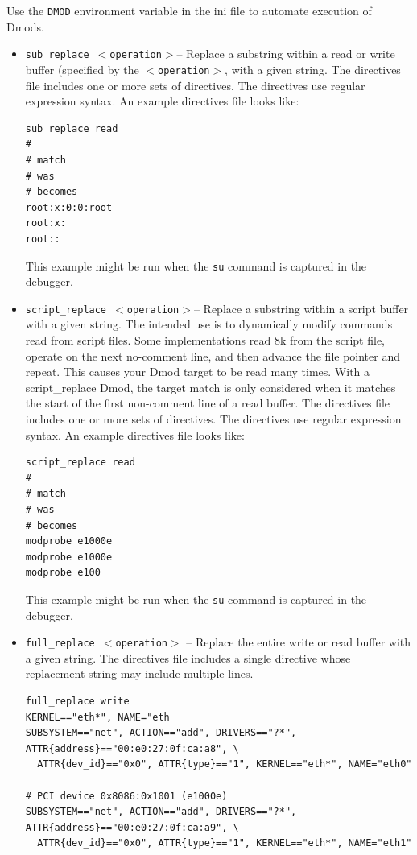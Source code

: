 \documentclass[titlepage]{article}
\begin{document}
Use the {\tt DMOD} environment variable in the ini file to automate execution of Dmods.
 
\begin{itemize}
\item {\tt sub\_replace $<$operation$>$}-- Replace a substring within a read or write buffer (specified by the
{\tt $<$operation$>$}, with a given string.
The directives file includes one or more sets of directives.
The directives use regular expression syntax.
An example directives file looks like:
\begin{verbatim}
sub_replace read
#
# match
# was
# becomes
root:x:0:0:root
root:x:
root::
\end{verbatim}
\noindent This example might be run when the {\tt su} command is captured in the debugger.

\item {\tt script\_replace $<$operation$>$}-- Replace a substring within a script buffer with a given string.
The intended use is to dynamically modify commands read from script files. Some implementations read 8k
from the script file, operate on the next no-comment line, and then advance the file pointer and repeat.  This causes your Dmod target to be read
many times.  With a script\_replace Dmod, the target match is only considered when it matches the start
of the first non-comment line of a read buffer. 
The directives file includes one or more sets of directives.
The directives use regular expression syntax.
An example directives file looks like:
\begin{verbatim}
script_replace read
#
# match
# was
# becomes
modprobe e1000e
modprobe e1000e
modprobe e100
\end{verbatim}
\noindent This example might be run when the {\tt su} command is captured in the debugger.

\item {\tt full\_replace $<$operation$>$} -- Replace the entire write or read buffer with a given string.
The directives file includes a single directive whose replacement string may include multiple lines.
\begin{verbatim}
full_replace write
KERNEL=="eth*", NAME="eth
SUBSYSTEM=="net", ACTION=="add", DRIVERS=="?*", ATTR{address}=="00:e0:27:0f:ca:a8", \
  ATTR{dev_id}=="0x0", ATTR{type}=="1", KERNEL=="eth*", NAME="eth0"

# PCI device 0x8086:0x1001 (e1000e)
SUBSYSTEM=="net", ACTION=="add", DRIVERS=="?*", ATTR{address}=="00:e0:27:0f:ca:a9", \
  ATTR{dev_id}=="0x0", ATTR{type}=="1", KERNEL=="eth*", NAME="eth1"
\end{verbatim}


\end{itemize}
\end{document}
